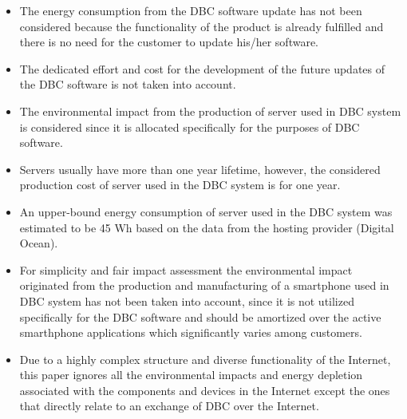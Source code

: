 \documentclass[conference]{IEEEtran}
\begin{document}
\begin{itemize}
\item The energy consumption from the DBC software update has not been considered because the functionality of the product is already fulfilled and there is no need for the customer to update his/her software.
\item The dedicated effort and cost for the development of the future updates of the DBC software is not taken into account.
\item The environmental impact from the production of server used in DBC system is considered since it is allocated specifically for the purposes of DBC software.
\item Servers usually have more than one year lifetime, however, the considered production cost of server used in the DBC system is for one year.
 \item An upper-bound energy consumption of server used in the DBC system was estimated to be 45 Wh based on the data from the hosting provider (Digital Ocean).
\item For simplicity and fair impact assessment the environmental impact originated from the production and manufacturing of a smartphone used in DBC system has not been taken into account, since it is not utilized specifically for the DBC software and should be amortized over the active smarthphone applications which significantly varies among customers.
\item Due to a highly complex structure and diverse functionality of the Internet, this paper ignores all the environmental impacts and energy depletion associated with the components and devices in the Internet except the ones that directly relate to an exchange of DBC over the Internet.
\end{itemize}
\end{document}
